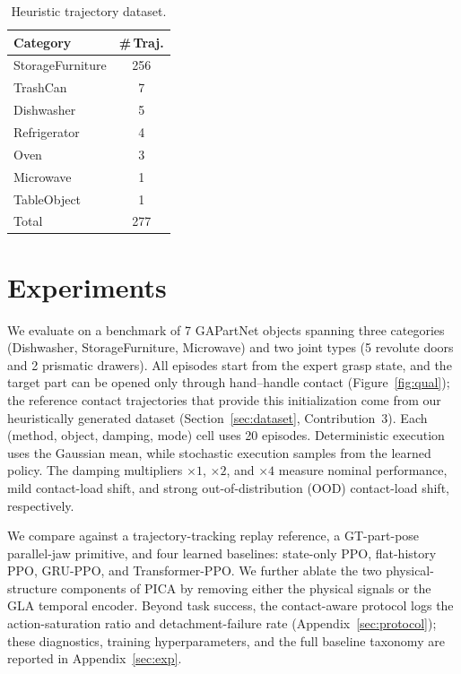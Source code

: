 \documentclass{llmxive}
\begin{document}
\begin{table}[t]

    \vspace{-1.0em}
    \centering
    \small
    \setlength{\tabcolsep}{4pt}
    \begin{tabular}{lc}
        \toprule
        Category & \#\,Traj. \\
        \midrule
        StorageFurniture & 256 \\
        TrashCan         & 7 \\
        Dishwasher       & 5 \\
        Refrigerator     & 4 \\
        Oven             & 3 \\
        Microwave        & 1 \\
        TableObject           & 1 \\
        \midrule
        Total            & 277 \\
        \bottomrule
    \end{tabular}
    \vspace{-1.0em}

\caption{Heuristic trajectory dataset.}
\label{tab:dataset}
\end{table}





\section{Experiments}
\label{sec:result}
\label{sec:exp_main}

We evaluate on a benchmark of 7 GAPartNet objects spanning three categories (Dishwasher, StorageFurniture, Microwave) and two joint types (5 revolute doors and 2 prismatic drawers). All episodes start from the expert grasp state, and the target part can be opened only through hand--handle contact (Figure~\ref{fig:qual}); the reference contact trajectories that provide this initialization come from our heuristically generated dataset (Section~\ref{sec:dataset}, Contribution~3). Each (method, object, damping, mode) cell uses 20 episodes. Deterministic execution uses the Gaussian mean, while stochastic execution samples from the learned policy. The damping multipliers $\times1$, $\times2$, and $\times4$ measure nominal performance, mild contact-load shift, and strong out-of-distribution (OOD) contact-load shift, respectively.

We compare against a trajectory-tracking replay reference, a GT-part-pose parallel-jaw primitive, and four learned baselines: state-only PPO, flat-history PPO, GRU-PPO, and Transformer-PPO. We further ablate the two physical-structure components of PICA by removing either the physical signals or the GLA temporal encoder. Beyond task success, the contact-aware protocol logs the action-saturation ratio and detachment-failure rate (Appendix~\ref{sec:protocol}); these diagnostics, training hyperparameters, and the full baseline taxonomy are reported in Appendix~\ref{sec:exp}.
\end{document}
